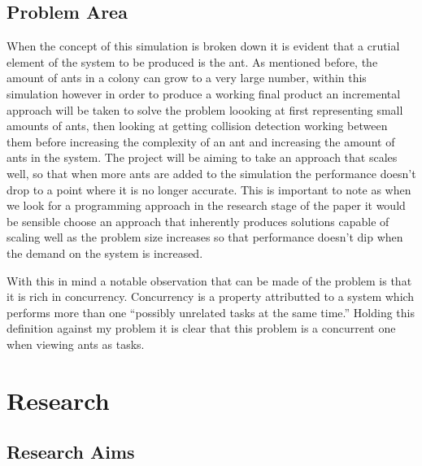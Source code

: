 \documentclass[main.tex]{subfiles}
\begin{document}
\section{Problem Area}
When the concept of this simulation is broken down it is evident that a crutial element of the system to be produced is the ant. As mentioned before, the amount of ants in a colony can grow to a very large number, within this simulation however in order to produce a working final product an incremental approach will be taken to solve the problem loooking at first representing small amounts of ants, then looking at getting collision detection working between them before increasing the complexity of an ant and increasing the amount of ants in the system. The project will be aiming to take an approach that scales well, so that when more ants are added to the simulation the performance doesn't drop to a point where it is no longer accurate. This is important to note as when we look for a programming approach in the research stage of the paper it would be sensible choose an approach that inherently produces solutions capable of scaling well as the problem size increases so that performance doesn't dip when the demand on the system is increased.

With this in mind a notable observation that can be made of the problem is that it is rich in concurrency. Concurrency is a property attributted to a system which performs more than one ``possibly unrelated tasks at the same time.'' \cite{OSullivan2008} Holding this definition against my problem it is clear that this problem is a concurrent one when viewing ants as tasks.

\chapter{Research}
\section {Research Aims}
\end{document}
